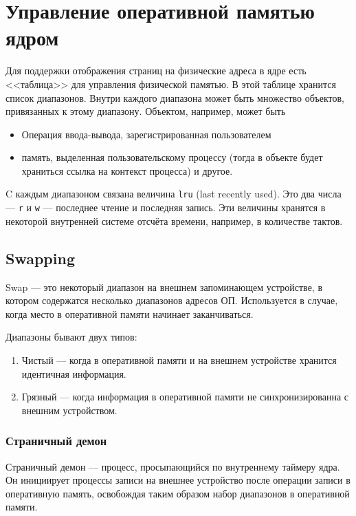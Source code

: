 \section{Управление оперативной памятью ядром}

Для поддержки отображения страниц на физические адреса в ядре есть <<таблица>> для управления физической памятью. В этой таблице хранится список диапазонов. Внутри каждого диапазона может быть множество объектов, привязанных к этому диапазону. Объектом, например, может быть 

\begin{itemize}
\item Операция ввода-вывода, зарегистрированная пользователем
\item память, выделенная пользовательскому процессу (тогда в объекте будет храниться ссылка на контекст процесса) и другое.
\end{itemize}

C каждым диапазоном связана величина \verb!lru! (last recently used). Это два числа --- \verb!r! и \verb!w! --- последнее чтение и последняя запись. Эти величины хранятся в некоторой внутренней системе отсчёта времени, например, в количестве тактов.

\subsection{Swapping}

Swap --- это некоторый диапазон на внешнем запоминающем устройстве, в котором содержатся несколько диапазонов адресов ОП. Используется в случае, когда место в оперативной памяти начинает заканчиваться.

Диапазоны бывают двух типов:

\begin{enumerate}
\item Чистый --- когда в оперативной памяти и на внешнем устройстве хранится идентичная информация.
\item Грязный --- когда информация в оперативной памяти не синхронизированна с внешним устройством.
\end{enumerate}

\subsubsection*{Страничный демон}

Страничный демон --- процесс, просыпающийся по внутреннему таймеру ядра. Он инициирует процессы записи на внешнее устройство после операции записи в оперативную память, освобождая таким образом набор диапазонов в оперативной памяти.

